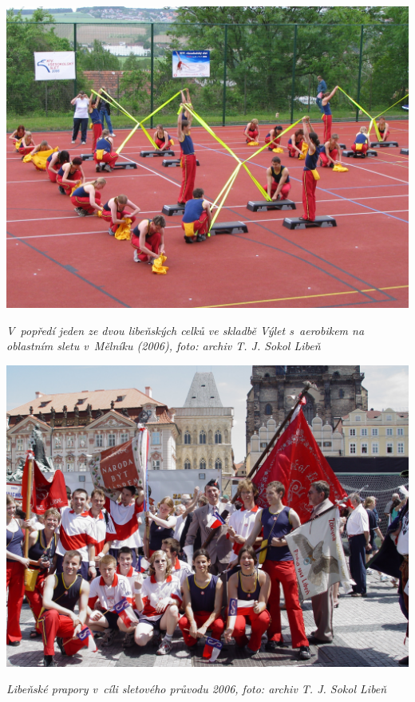 \documentclass[a5paper, 11pt, twoside]{article}
\begin{document}
 \includegraphics[width=\textwidth]{img/52_vylet_s_aerobikem.jpg}

\textit{V~popředí jeden ze dvou libeňských celků ve skladbě Výlet
s~aerobikem na oblastním sletu v~Mělníku (2006), foto: archiv T. J. Sokol
Libeň}

 \includegraphics[width=\textwidth]{img/53_slet_pruvod.JPG}

\textit{Libeňské prapory v~cíli sletového průvodu 2006, foto: archiv T. J.
Sokol Libeň}
\end{document}
